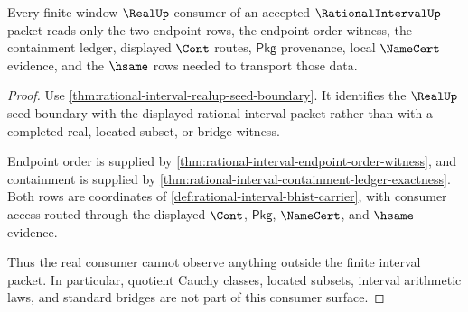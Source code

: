 \begin{theorem}
\label{thm:rational-interval-realup-consumer-exactness}
Every finite-window $\RealUp$ consumer of an accepted $\RationalIntervalUp$
packet reads only the two endpoint rows, the endpoint-order witness, the
containment ledger, displayed $\Cont$ routes, $\mathsf{Pkg}$ provenance,
local $\NameCert$ evidence, and the $\hsame$ rows needed to transport those
data.
\end{theorem}
\begin{proof}
Use \autoref{thm:rational-interval-realup-seed-boundary}. It identifies the
$\RealUp$ seed boundary with the displayed rational interval packet rather
than with a completed real, located subset, or bridge witness.

Endpoint order is supplied by
\autoref{thm:rational-interval-endpoint-order-witness}, and containment is
supplied by \autoref{thm:rational-interval-containment-ledger-exactness}.
Both rows are coordinates of
\autoref{def:rational-interval-bhist-carrier}, with consumer access routed
through the displayed $\Cont$, $\mathsf{Pkg}$, $\NameCert$, and $\hsame$
evidence.

Thus the real consumer cannot observe anything outside the finite interval
packet. In particular, quotient Cauchy classes, located subsets, interval
arithmetic laws, and standard bridges are not part of this consumer surface.
\end{proof}

